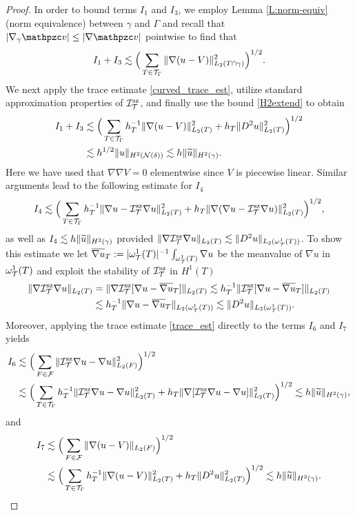 \begin{proof}
In order to bound terms $I_1$ and $I_3$, we employ Lemma \ref{L:norm-equiv} (norm equivalence) between $\gamma$ and $\Gamma$ and recall that $|\nabla_\gamma \tv| \le |\nabla \tv|$ pointwise to find that
%
\begin{align*}
  I_1+I_3 \lesssim \Big (\sum_{T \in \mathcal{T}_\Gamma} \|\nabla (u-V)\|_{L_2(T \cap \gamma)} ^2 \Big)^{1/2}.
\end{align*}  
%
We next apply the trace estimate \eqref{curved_trace_est}, utilize standard approximation properties of $\mathcal{I}_{\mathcal{T}}^{\textrm{sz}}$, and finally use the bound \eqref{H2extend} to obtain
%
\begin{align*}
I_1+I_3 & \lesssim \Big(\sum_{T\in \mathcal{T}_\Gamma} h_T^{-1} \|\nabla (u-V)\|_{L_2(T)}^2 + h_T\|D^2 u\|_{L_2(T)}^2 \Big)^{1/2}
\\ & \lesssim h^{1/2} \|u\|_{H^2(\mathcal{N}(\delta))} \lesssim h \|\widetilde{u}\|_{H^2(\gamma)}.
\end{align*}
%
Here we have used that $\nabla \nabla V=0$ elementwise since $V$ is piecewise linear. Similar arguments lead to the following estimate for $I_4$
%
\[
I_4 \lesssim \Big(\sum_{T\in \mathcal{T}_\Gamma} h_T^{-1} \|\nabla u-\mathcal{I}_{\mathcal{T}}^{\textrm{sz}} \nabla u\|_{L_2(T)}^2 + h_T\|\nabla(\nabla u-\mathcal{I}_{\mathcal{T}}^{\textrm{sz}} \nabla u)\|_{L_2(T)}^2 \Big)^{1/2},
\]
%
as well as $I_4 \lesssim h \|\widetilde{u}\|_{H^2(\gamma)}$ provided $\|\nabla \mathcal{I}_{\mathcal{T}}^{\textrm{sz}} \nabla u\|_{L_2(T)} \lesssim \|D^2 u\|_{L_2(\omega_{\mathcal{T}}^1(T))}$. To show this estimate we let $\overline{\nabla u}_T := |\omega_{\mathcal{T}}^1(T)|^{-1} \int_{\omega_{\mathcal{T}}^1(T)} \nabla u$ be the meanvalue of $\nabla u$ in $\omega_{\mathcal{T}}^1(T)$ and exploit the stability of $\mathcal{I}_{\mathcal{T}}^{\textrm{sz}}$ in $H^1(T)$
%
\begin{align*}
  \|\nabla \mathcal{I}_{\mathcal{T}}^{\textrm{sz}} \nabla u\|_{L_2(T)}
  &= \|\nabla \mathcal{I}_{\mathcal{T}}^{\textrm{sz}} [\nabla u - \overline{\nabla u}_T]\|_{L_2(T)}
  \lesssim h_T^{-1} \|\mathcal{I}_{\mathcal{T}}^{\textrm{sz}}[\nabla u - \overline{\nabla u}_T]\|_{L_2(T)}
  \\ &
  \lesssim h_T^{-1} \|\nabla u - \overline{\nabla u}_T\|_{L_2(\omega_{\mathcal{T}}^1(T))}
  \lesssim \|D^2 u \|_{L_2(\omega_{\mathcal{T}}^1(T))}.
\end{align*}
%
Moreover, applying the trace estimate \eqref{trace_est} directly to the terms $I_6$ and
$I_7$ yields
%
\begin{align*}
I_6 & \lesssim \Big(\sum_{F \in \mathcal{F}} \|\mathcal{I}_{\mathcal{T}}^{\textrm{sz}} \nabla u-\nabla u\|_{L_2(F)}^2 \Big)^{1/2} 
\\ & \lesssim \Big(\sum_{T \in \mathcal{T}_\Gamma} h_T^{-1} \|\mathcal{I}_{\mathcal{T}}^{\textrm{sz}} \nabla u -\nabla u\|_{L_2(T)}^2 + h_T \|\nabla[\mathcal{I}_{\mathcal{T}}^{\textrm{sz}} \nabla u -\nabla u]\|_{L_2(T)}^2 \Big)^{1/2}
\lesssim h \|\widetilde{u}\|_{H^2(\gamma)},
\end{align*}
%
and
\begin{align*}
I_7 & \lesssim \Big(\sum_{F \in \mathcal{F}} \|\nabla(u-V)\|_{L_2(F)}\Big)^{1/2}
\\ &
\lesssim \Big(\sum_{T \in \mathcal{T}_\Gamma} h_T^{-1} \|\nabla (u-V)\|_{L_2(T)}^2 + h_T \|D^2 u\|_{L_2(T)}^2\Big)^{1/2}
\lesssim h \|\widetilde{u}\|_{H^2(\gamma)}. 
\end{align*}


\end{proof}
